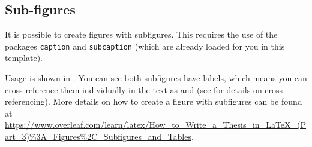 \subsection{Sub-figures}
\label{sec:SubFigures}

It is possible to create figures with subfigures. 
This requires the use of the packages \verb|caption| and \verb|subcaption| (which are already loaded for you in this template).

Usage is shown in . 
You can see both subfigures have labels, which means you can cross-reference them individually in the text as  and  (see  for details on cross-referencing).
More details on how to create a figure with subfigures can be found at \url{https://www.overleaf.com/learn/latex/How_to_Write_a_Thesis_in_LaTeX_(Part_3)\%3A_Figures\%2C_Subfigures_and_Tables}.


